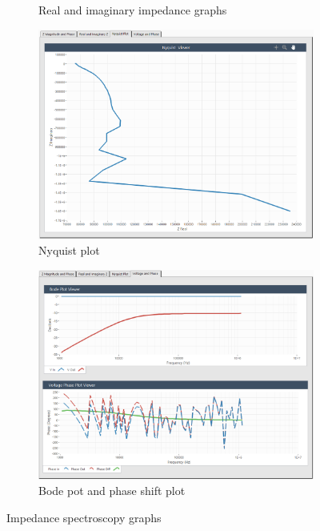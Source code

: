 \begin{figure}[h]
\begin{subfigure}[b]{0.48\textwidth}
        \caption{Real and imaginary impedance graphs}
        \label{fig:labview_real-imag_graph}
    \end{subfigure}
    \vspace{0.2in}
    \vfill
    \begin{subfigure}[b]{0.48\textwidth}
        \centering
        \includegraphics[width=\textwidth]{images/labview_nyquist_graph.png}
        \caption{Nyquist plot}
        \label{fig:labview_nyquist_plot}
    \end{subfigure}
    \hfill
    \begin{subfigure}[b]{0.48\textwidth}
        \centering
        \includegraphics[width=\textwidth]{images/labview_bode_phase_graph.png}
        \caption{Bode pot and phase shift plot}
        \label{fig:labview_bode-phase_plot}
    \end{subfigure}
    \caption{Impedance spectroscopy graphs}
    \label{fig:labview_IS_graphs}
\end{figure}


